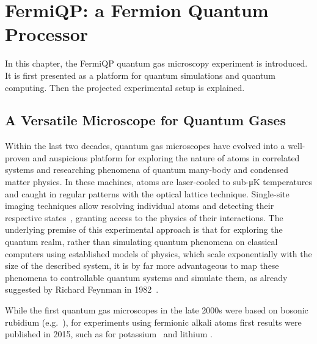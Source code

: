 \renewcommand{\imagepath}{../20-fermiqp/img}

\chapter{FermiQP: a Fermion Quantum Processor}
In this chapter, the FermiQP quantum gas microscopy experiment is introduced. It is first presented as a platform for quantum simulations and quantum computing. Then the projected experimental setup is explained.

\section{A Versatile Microscope for Quantum Gases}
Within the last two decades, quantum gas microscopes have evolved into a well-proven and auspicious platform for exploring the nature of atoms in correlated systems and researching phenomena of quantum many-body and condensed matter physics. In these machines, atoms are laser-cooled to sub-\si[]{\micro\kelvin} temperatures and caught in regular patterns with the optical lattice technique. Single-site imaging techniques allow resolving individual atoms and detecting their respective states~\cite{bloch_many-body_2008,gross_quantum_2017, gross_quantum_2021}, granting access to the physics of their interactions. The underlying premise of this experimental approach is that for exploring the quantum realm, rather than simulating quantum phenomena on classical computers using established models of physics, which scale exponentially with the size of the described system, it is by far more advantageous to map these phenomena to controllable quantum systems and simulate them, as already suggested by Richard Feynman in 1982~\cite{feynman_simulating_1982}.

While the first quantum gas microscopes in the late 2000s were based on bosonic rubidium (e.g.~\cite{sherson_single-atom-resolved_2010}), for experiments using fermionic alkali atoms  first results were published in 2015, such as for potassium~\cite{cheuk_quantum-gas_2015} and lithium \cite{parsons_site-resolved_2015, omran_microscopic_2015}.

